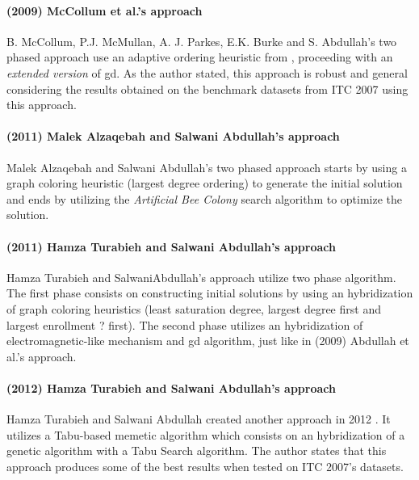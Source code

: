 \paragraph{(2009) McCollum et al.'s approach}
B. McCollum, P.J. McMullan, A. J. Parkes, E.K. Burke and S. Abdullah's two phased approach \cite{McCollum2009} use an adaptive ordering heuristic from \cite{Burke2004}, proceeding with an \textit{extended version} of \gls{gd}. As the author stated, this approach is robust and general considering the results obtained on the benchmark datasets from ITC 2007 using this approach.\\

\paragraph{(2011) Malek Alzaqebah and Salwani Abdullah's approach}
Malek Alzaqebah and Salwani Abdullah's two phased approach \cite{Alzaqebah2011} starts by using a graph coloring heuristic (largest degree ordering) to generate the initial solution and ends by utilizing the \textit{Artificial Bee Colony} search algorithm to optimize the solution.\\

\paragraph{(2011) Hamza Turabieh and Salwani Abdullah's approach}
Hamza Turabieh and SalwaniAbdullah's approach \cite{Turabieh2011} utilize two phase algorithm. The first phase consists on constructing initial solutions by using an hybridization of graph coloring heuristics (least saturation degree, largest degree first and largest enrollment {\color{red} ?} first). The second phase utilizes an hybridization of electromagnetic-like mechanism and \gls{gd} algorithm, just like in (2009) Abdullah et al.'s approach.\\

\paragraph{(2012) Hamza Turabieh and Salwani Abdullah's approach}
Hamza Turabieh and Salwani Abdullah created another approach in 2012 \cite{Abdullah2012}. It utilizes a Tabu-based memetic algorithm which consists on an hybridization of a genetic algorithm with a Tabu Search algorithm. The author states that this approach produces some of the best results when tested on ITC 2007's datasets.\\

